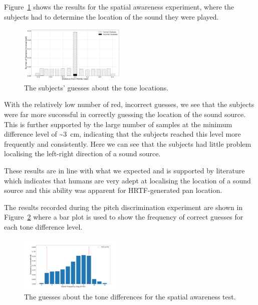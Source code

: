 \documentclass[format=sigconf, review=true, screen=true, anonymous=true]{acmart}
\begin{document}
Figure~\ref{fig:location-guesses} shows the results for the spatial awareness experiment, where the subjects had to determine the location of the sound they were played. 

\begin{figure}
  \centering
  \includegraphics[width=0.45\textwidth]{figures/location_guesses.png}
  \caption{The subjects' guesses about the tone locations.}
  \label{fig:location-guesses}
\end{figure}

With the relatively low number of red, incorrect guesses, we see that the subjects were far more successful in correctly guessing the location of the sound source. This is further supported by the large number of samples at the minimum difference level of \textasciitilde\SI{3}{\cm}, indicating that the subjects reached this level more frequently and consistently. Here we can see that the subjects had little problem localising the left-right direction of a sound source. 

These results are in line with what we expected and is supported by literature which indicates that humans are very adept at localising the location of a sound source and this ability was apparent for HRTF-generated pan location. 


The results recorded during the pitch discrimination experiment are shown in Figure~\ref{fig:tone-guesses} where a bar plot is used to show the frequency of correct guesses for each tone difference level. 

\begin{figure}
  \centering
  \includegraphics[width=0.45\textwidth]{figures/tone_guesses.png}
  \caption{The guesses about the tone differences for the spatial awareness test.}
  \label{fig:tone-guesses}
\end{figure}
\end{document}
